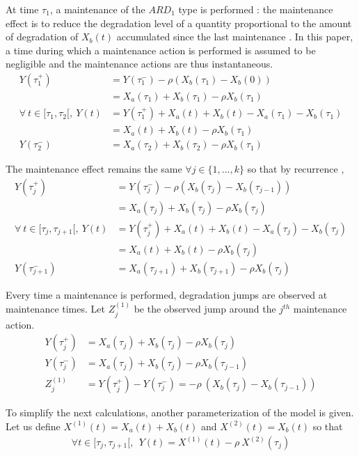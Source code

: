 \noindent At time $\tau_1$, a maintenance of the $ARD_1$ type is performed : the maintenance effect is to reduce the degradation level of a quantity proportional to the amount of degradation of $X_b(t)$ accumulated since the last maintenance \cite{mercier_stochastic_2019}. In this paper, a time during which a maintenance action is performed is assumed to be negligible and the maintenance actions are thus instantaneous.
\begin{align*}
Y(\tau_1^+)&=Y(\tau_1^-)-\rho \left(X_b(\tau_1)- X_b(0)\right) \\
&=X_a(\tau_1)+X_b(\tau_1)-\rho X_b(\tau_1)\\
\forall\ t \in [\tau_1,\tau_2[,\ Y(t)&=Y(\tau_1^+)+X_a(t)+X_b(t)-X_a(\tau_1)-X_b(\tau_1)\\
&=X_a(t)+X_b(t)-\rho X_b(\tau_1)\\
Y(\tau_2^-)&=X_a(\tau_2)+X_b(\tau_2)-\rho X_b(\tau_1)
\end{align*}

The maintenance effect remains the same  $ \forall j \in \{1,...,k\}$ so that by recurrence ,
\begin{align*}
Y(\tau_j^+)&=Y(\tau_j^-)-\rho \left(X_b(\tau_j)- X_b(\tau_{j-1})\right) \\
&=X_a(\tau_j)+X_b(\tau_j)-\rho X_b(\tau_j)\\
\forall\ t \in [\tau_j,\tau_{j+1}[,\ Y(t)&=Y(\tau_j^+)+X_a(t)+X_b(t)-X_a(\tau_j)-X_b(\tau_j)\\
&=X_a(t)+X_b(t)-\rho X_b(\tau_j)\\
Y(\tau_{j+1}^-)&=X_a(\tau_{j+1})+X_b(\tau_{j+1})-\rho X_b(\tau_j)
\end{align*}


Every time a maintenance is performed, degradation jumps are observed at maintenance times. Let $Z_j^{(1)}$ be the observed jump around the $j^{th}$ maintenance action.
\begin{align*}
Y(\tau_j^+)&=X_a(\tau_j)+X_b(\tau_j)-\rho X_b(\tau_j)\\
Y(\tau_j^-)&=X_a(\tau_{j})+X_b(\tau_j)-\rho X_b(\tau_{j-1})\\
Z_j^{(1)}&=Y(\tau_j^+)-Y(\tau_j^-)=-\rho\ \left(X_b(\tau_j)- X_b(\tau_{j-1})\right)
\end{align*}

\noindent To simplify the next calculations, another parameterization of the model is given.
Let us define $X^{(1)}(t)= X_a(t)+X_b(t)$ and $X^{(2)}(t)=X_b(t)$ so that 
\begin{align}
\forall t\in [\tau_j,\tau_{j+1}[,\ \ Y(t)=X^{(1)}(t)-\rho\ X^{(2)}(\tau_j)
\label{eq:Yt}
\end{align}



